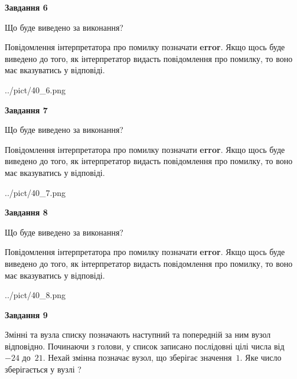 \documentclass[12pt, ukrainian]{article}
\begin{document}
{\begin {large}
{\begin {center}\textbf{Завдання 6}\end {center}}\par
Що буде виведено за виконання?

Повідомлення інтерпретатора про помилку позначати \textbf{error}.
Якщо щось буде виведено до того, як інтерпретатор видасть повідомлення про помилку, 
то воно має вказуватись у відповіді. \par


\begin{center}
	{../pict/40_6.png}
\end{center}
\newpage

{\begin {center}\textbf{Завдання 7}\end {center}}\par
Що буде виведено за виконання?

Повідомлення інтерпретатора про помилку позначати \textbf{error}.
Якщо щось буде виведено до того, як інтерпретатор видасть повідомлення про помилку, 
то воно має вказуватись у відповіді. \par


\begin{center}
	{../pict/40_7.png}
\end{center}
\newpage

{\begin {center}\textbf{Завдання 8}\end {center}}\par
Що буде виведено за виконання?

Повідомлення інтерпретатора про помилку позначати \textbf{error}.
Якщо щось буде виведено до того, як інтерпретатор видасть повідомлення про помилку, 
то воно має вказуватись у відповіді. \par


\begin{center}
	{../pict/40_8.png}
\end{center}
\newpage

{\begin {center}\textbf{Завдання 9}\end {center}}\par
Змінні  та  вузла списку позначають наступний та попередній за ним вузол відповідно. Починаючи з голови, у список записано послідовні цілі числа від~$-24$ до~$21$. Нехай змінна  позначає вузол, що зберігає значення~$1$.
Яке число зберігається у вузлі  ?\par
\newpage


\end{large}}
\end{document}
